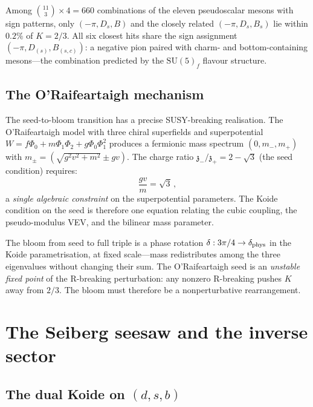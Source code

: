 \documentclass[12pt,a4paper]{article}
\newcommand{\SU}{\mathrm{SU}}
\newcommand{\zch}{\mathfrak{z}}
\begin{document}
Among $\binom{11}{3} \times 4 = 660$ combinations of the
eleven pseudoscalar mesons with sign patterns, only
$(-\pi, D_s, B)$ and the closely related $(-\pi, D_s, B_s)$
lie within $0.2\%$ of $K = 2/3$.
All six closest hits share the sign assignment
$(-\pi, D_{(s)}, B_{(s,c)})$: a negative pion paired with
charm- and bottom-containing mesons---the combination predicted
by the $\SU(5)_f$ flavour structure.

\subsection{The O'Raifeartaigh mechanism}

The seed-to-bloom transition has a precise SUSY-breaking
realisation.
The O'Raifeartaigh model with three chiral superfields and
superpotential $W = f\Phi_0 + m\Phi_1\Phi_2 + g\Phi_0\Phi_1^2$
produces a fermionic mass spectrum $(0, m_-, m_+)$ with
$m_\pm = (\sqrt{g^2v^2 + m^2} \pm gv)$.
The charge ratio $\zch_- / \zch_+ = 2 - \sqrt{3}$ (the seed
condition) requires:
\begin{equation}
  \boxed{\frac{gv}{m} = \sqrt{3}\,,}
  \label{eq:OR_seed}
\end{equation}
a \emph{single algebraic constraint} on the superpotential
parameters.
The Koide condition on the seed is therefore one equation
relating the cubic coupling, the pseudo-modulus VEV, and the
bilinear mass parameter.

The bloom from seed to full triple is a phase rotation
$\delta: 3\pi/4 \to \delta_{\rm phys}$ in the Koide
parametrisation, at fixed scale---mass redistributes among
the three eigenvalues without changing their sum.
The O'Raifeartaigh seed is an \emph{unstable fixed point} of
the R-breaking perturbation: any nonzero R-breaking pushes
$K$ away from $2/3$.
The bloom must therefore be a nonperturbative rearrangement.


\section{The Seiberg seesaw and the inverse sector}
\label{sec:inverse}

\subsection{The dual Koide on $(d, s, b)$}
\end{document}
